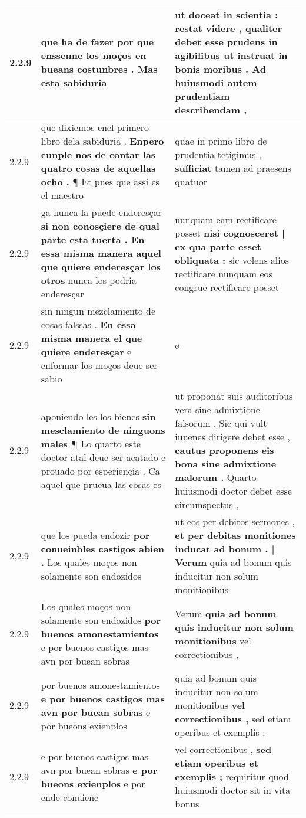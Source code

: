\begin{tabular}{|p{1cm}|p{6.5cm}|p{6.5cm}|}
2.2.9 & que ha de fazer \textbf{ por que enssenne los moços en bueans costunbres . } Mas esta sabiduria & ut doceat in scientia : restat videre , \textbf{ qualiter debet esse prudens in agibilibus ut instruat in bonis moribus . } Ad huiusmodi autem prudentiam describendam , \\\hline
2.2.9 & que dixiemos enel primero libro dela sabiduria . \textbf{ Enpero cunple nos de contar las quatro cosas de aquellas ocho . } ¶ Et pues que assi es el maestro & quae in primo libro de prudentia tetigimus , \textbf{ sufficiat } tamen ad praesens quatuor \\\hline
2.2.9 & ga nunca la puede enderesçar \textbf{ si non conosçiere de qual parte esta tuerta . En essa misma manera aquel que quiere enderesçar los otros } nunca los podria enderesçar & nunquam eam rectificare posset \textbf{ nisi cognosceret | ex qua parte esset obliquata : } sic volens alios rectificare nunquam eos congrue rectificare posset \\\hline
2.2.9 & sin ningun mezclamiento de cosas falssas . \textbf{ En essa misma manera el que quiere enderesçar } e enformar los moços deue ser sabio & ø \\\hline
2.2.9 & aponiendo les los bienes \textbf{ sin mesclamiento de ninguons males ¶ } Lo quarto este doctor atal deue ser acatado e prouado por esperiençia . Ca aquel que prueua las cosas es & ut proponat suis auditoribus vera sine admixtione falsorum . Sic qui vult iuuenes dirigere debet esse , \textbf{ cautus proponens eis bona sine admixtione malorum . } Quarto huiusmodi doctor debet esse circumspectus , \\\hline
2.2.9 & que los pueda endozir \textbf{ por conueinbles castigos abien . } Los quales moços non solamente son endozidos & ut eos per debitos sermones , \textbf{ et per debitas monitiones inducat ad bonum . | Verum } quia ad bonum quis inducitur non solum monitionibus \\\hline
2.2.9 & Los quales moços non solamente son endozidos \textbf{ por buenos amonestamientos } e por buenos castigos mas avn por buean sobras & Verum \textbf{ quia ad bonum quis inducitur non solum monitionibus } vel correctionibus , \\\hline
2.2.9 & por buenos amonestamientos \textbf{ e por buenos castigos mas avn por buean sobras } e por bueons exienplos & quia ad bonum quis inducitur non solum monitionibus \textbf{ vel correctionibus , } sed etiam operibus et exemplis ; \\\hline
2.2.9 & e por buenos castigos mas avn por buean sobras \textbf{ e por bueons exienplos } e por ende conuiene & vel correctionibus , \textbf{ sed etiam operibus et exemplis ; } requiritur quod huiusmodi doctor sit in vita bonus \\\hline

\end{tabular}
